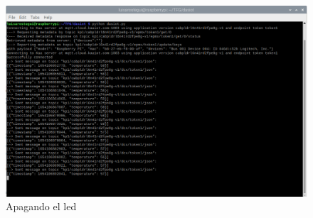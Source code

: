 {\begin{figure}[p]
    \centering
    \includegraphics[width=\linewidth]{imagenes/2022-06-01-200813_1920x1080_scrot.png}
    \caption{Apagando el led}
    \label{fig:figure18}
\end{figure}



}